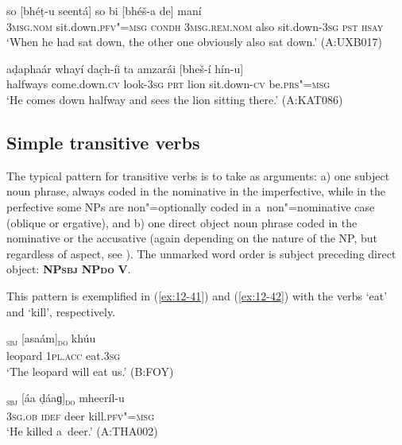 \begin{exe}
\ex
\label{ex:12-39}
\gll so [bhéṭ-u seentá] so bi [bhéš-a de] maní \\
\textsc{3msg.nom} sit.down.\textsc{pfv"=msg} \textsc{condh} \textsc{3msg.rem.nom} also  sit.down-\textsc{3sg} \textsc{pst } \textsc{hsay} \\
\glt `When he had sat down, the other one obviously also sat down.' (A:UXB017)

\ex
\label{ex:12-40}
\gll aḍaphaár whayí dac̣h-íi ta amzarái [bheš-í hín-u] \\
halfways come.down.\textsc{cv} look-\textsc{3sg } \textsc{prt} lion sit.down-\textsc{cv} be.\textsc{prs"=msg} \\
\glt `He comes down halfway and sees the lion sitting there.' (A:KAT086)
\end{exe}

\subsection{Simple transitive verbs}
\label{subsec:12-2-3}


The typical pattern for transitive verbs is to take as arguments: a) one subject noun phrase, always coded in the nominative in the imperfective, while in the perfective some NPs are non"=optionally coded in a~non"=nominative case (oblique or ergative), and b) one direct object noun phrase coded in the nominative or the accusative (again depending on the nature of the NP, but regardless of aspect, see ). The unmarked word order is subject preceding direct object: \textbf{NP\textsc{sbj}} \textbf{NP\textsc{do}} \textbf{V}.


This pattern is exemplified in (\ref{ex:12-41}) and (\ref{ex:12-42}) with the verbs `eat' and `kill', respectively.

\begin{exe}
\ex
\label{ex:12-41}
\gll [karáaṛu]\textsubscript{\textsc{sbj}} [asaám]\textsubscript{\textsc{do}} khúu \\
leopard \textsc{1pl.acc} eat.3\textsc{sg} \\
\glt `The leopard will eat us.' (B:FOY)
\end{exe}
\begin{exe}
\ex
\label{ex:12-42}
\gll [tíi]\textsubscript{\textsc{sbj}} [áa ḍáaɡ]\textsubscript{\textsc{do}} mheeríl-u \\
\textsc{3sg.ob} \textsc{idef} deer kill.\textsc{pfv"=msg} \\
\glt `He killed a~deer.' (A:THA002)
\end{exe}

